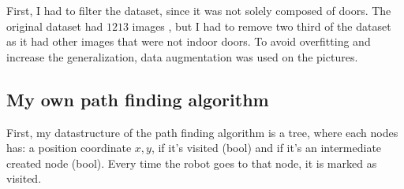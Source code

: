 \documentclass{article}
\begin{document}
First, I had to filter the dataset, since it was not solely composed of doors. The original dataset had $1213$ images \cite{Arduengo_2021}, but I had to remove two third of the dataset as it had other images that were not indoor doors. To avoid overfitting and increase the generalization, data augmentation was used on the pictures. 


\subsection{My own path finding algorithm}

First, my datastructure of the path finding algorithm is a tree, where each nodes has: a position coordinate $x, y$, if it's visited (bool) and if it's an intermediate created node (bool). Every time the robot goes to that node, it is marked as visited. \\
\end{document}
